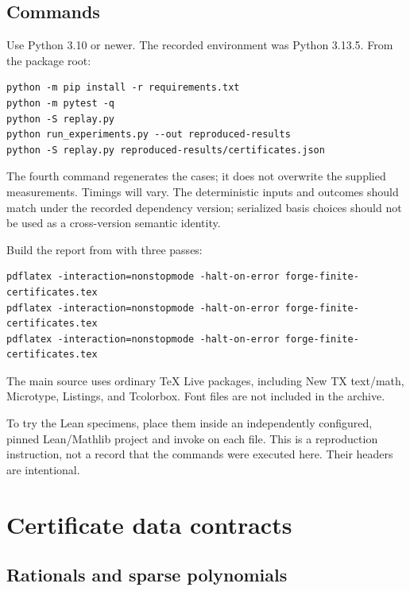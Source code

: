 \subsection{Commands}

Use Python 3.10 or newer. The recorded environment was Python 3.13.5. From the
package root:
\par\noindent\begin{minipage}{\linewidth}
\begin{lstlisting}
python -m pip install -r requirements.txt
python -m pytest -q
python -S replay.py
python run_experiments.py --out reproduced-results
python -S replay.py reproduced-results/certificates.json
\end{lstlisting}
\end{minipage}\par
The fourth command regenerates the cases; it does not overwrite the supplied
measurements. Timings will vary. The deterministic inputs and outcomes should
match under the recorded dependency version; serialized basis choices should
not be used as a cross-version semantic identity.

Build the report from  with three passes:
\par\noindent\begin{minipage}{\linewidth}
\begin{lstlisting}
pdflatex -interaction=nonstopmode -halt-on-error forge-finite-certificates.tex
pdflatex -interaction=nonstopmode -halt-on-error forge-finite-certificates.tex
pdflatex -interaction=nonstopmode -halt-on-error forge-finite-certificates.tex
\end{lstlisting}
\end{minipage}\par
The main source uses ordinary TeX Live packages, including New TX text/math,
Microtype, Listings, and Tcolorbox. Font files are not included in the archive.

To try the Lean specimens, place them inside an independently configured,
pinned Lean/Mathlib project and invoke  on each file. This
is a reproduction instruction, not a record that the commands were executed
here. Their  headers are intentional.

\section{Certificate data contracts}

\subsection{Rationals and sparse polynomials}

